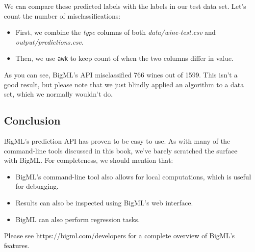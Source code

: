 \documentclass[
]{book}
\newenvironment{Shaded}{\begin{snugshade}}{\end{snugshade}}
\newcommand{\DataTypeTok}[1]{\textcolor[rgb]{0.13,0.29,0.53}{#1}}
\newcommand{\ExtensionTok}[1]{#1}
\newcommand{\FunctionTok}[1]{\textcolor[rgb]{0.00,0.00,0.00}{#1}}
\newcommand{\KeywordTok}[1]{\textcolor[rgb]{0.13,0.29,0.53}{\textbf{#1}}}
\newcommand{\NormalTok}[1]{#1}
\newcommand{\OperatorTok}[1]{\textcolor[rgb]{0.81,0.36,0.00}{\textbf{#1}}}
\newcommand{\StringTok}[1]{\textcolor[rgb]{0.31,0.60,0.02}{#1}}
\providecommand{\tightlist}{%
  \setlength{\itemsep}{0pt}\setlength{\parskip}{0pt}}
\theoremstyle{definition}
\theoremstyle{definition}
\theoremstyle{definition}
\theoremstyle{remark}
\begin{document}
We can compare these predicted labels with the labels in our test data set. Let's count the number of misclassifications:

\begin{Shaded}
\end{Shaded}

\begin{itemize}
\tightlist
\item
  First, we combine the \emph{type} columns of both \emph{data/wine-test.csv} and \emph{output/predictions.csv}.
\item
  Then, we use \texttt{awk} to keep count of when the two columns differ in value.
\end{itemize}

As you can see, BigML's API misclassified 766 wines out of 1599. This isn't a good result, but please note that we just blindly applied an algorithm to a data set, which we normally wouldn't do.

\hypertarget{conclusion}{%
\subsection{Conclusion}\label{conclusion}}

BigML's prediction API has proven to be easy to use. As with many of the command-line tools discussed in this book, we've barely scratched the surface with BigML. For completeness, we should mention that:

\begin{itemize}
\tightlist
\item
  BigML's command-line tool also allows for local computations, which is useful for debugging.
\item
  Results can also be inspected using BigML's web interface.
\item
  BigML can also perform regression tasks.
\end{itemize}

Please see \url{https://bigml.com/developers} for a complete overview of BigML's features.
\end{document}
